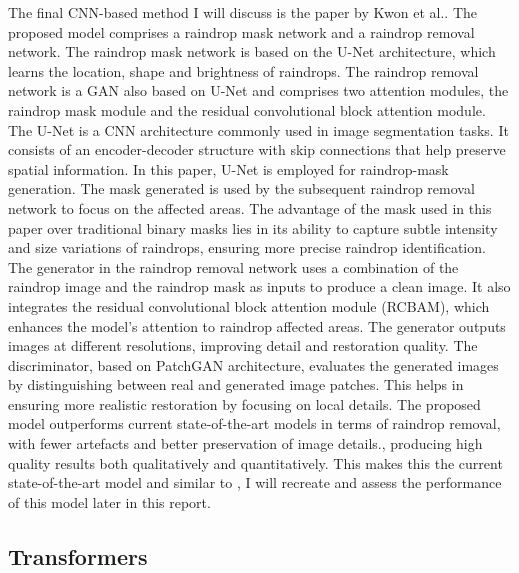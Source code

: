 \documentclass[11pt]{ociamthesis}  %
\begin{document}
The final CNN-based method I will discuss is the paper by Kwon et al.\cite{Kwon}. The proposed model comprises a raindrop mask network and a raindrop removal network. The raindrop mask network is based on the U-Net architecture\cite{U-Net}, which learns the location, shape and brightness of raindrops. The raindrop removal network is a GAN also based on U-Net and comprises two attention modules, the raindrop mask module and the residual convolutional block attention module\cite{woo2018cbam}. The U-Net is a CNN architecture commonly used in image segmentation tasks. It consists of an encoder-decoder structure with skip connections that help preserve spatial information. In this paper, U-Net is employed for raindrop-mask generation. The mask generated is used by the subsequent raindrop removal network to focus on the affected areas. The advantage of the mask used in this paper over traditional binary masks lies in its ability to capture subtle intensity and size variations of raindrops, ensuring more precise raindrop identification. The generator in the raindrop removal network uses a combination of the raindrop image and the raindrop mask as inputs to produce a clean image. It also integrates the residual convolutional block attention module (RCBAM), which enhances the model's attention to raindrop affected areas. The generator outputs images at different resolutions, improving detail and restoration quality. The discriminator, based on PatchGAN\cite{PatchGAN} architecture, evaluates the generated images by distinguishing between real and generated image patches. This helps in ensuring more realistic restoration by focusing on local details. The proposed model outperforms current state-of-the-art models in terms of raindrop removal, with fewer artefacts and better preservation of image details., producing high quality results both qualitatively and quantitatively. This makes this the current state-of-the-art model and similar to \cite{Parmeet_Report}, I will recreate and assess the performance of this model later in this report. 

\subsection{Transformers}
\end{document}
